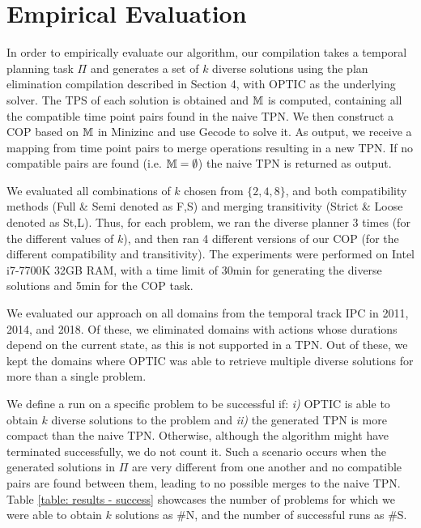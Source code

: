 \section{Empirical Evaluation}
In order to empirically evaluate our algorithm, our compilation takes a temporal planning task $\Pi$ and generates a set of $k$ diverse solutions using the plan elimination compilation described in Section 4, with OPTIC \cite{benton2012temporal} as the underlying solver. The TPS of each solution is obtained and $\mathbb{M}$ is computed, containing all the compatible time point pairs found in the naive TPN.
We then construct a COP based on $\mathbb{M}$ in Minizinc \cite{nethercote2007minizinc} and use Gecode \cite{gecode} to solve it. As output, we receive a mapping from time point pairs to merge operations resulting in a new TPN.
If no compatible pairs are found (i.e. $\mathbb{M} = \emptyset$) the naive TPN is returned as output. 


We evaluated all combinations of $k$ chosen from $\{2,4,8\}$, and both compatibility methods 
(Full \& Semi denoted as F,S) and merging transitivity (Strict \& Loose denoted as St,L). Thus, for each problem, we ran the diverse planner 3 times (for the different values of $k$), and then ran 4 different versions of our COP (for the different compatibility and transitivity). The experiments were performed on Intel i7-7700K 32GB RAM, with a time limit of 30min for generating the diverse solutions and 5min for the COP task.


We evaluated our approach on all domains from the temporal track IPC in 2011, 2014, and 2018. Of these, we eliminated domains with actions whose durations depend on the current state, as this is not supported in a TPN.
Out of these, we kept the domains where OPTIC was able to retrieve multiple diverse solutions for more than a single problem.

We define a run on a specific problem to be successful if: \textit{i)} OPTIC is able to obtain $k$
diverse solutions to the problem and \textit{ii)} the generated TPN is more compact than the naive TPN.
Otherwise, although the algorithm might have terminated successfully, we do not count it.
Such a scenario occurs when the generated solutions in $\Pi$ are very different from one another 
and no compatible pairs are found between them, leading to no possible merges to the naive TPN.
Table \ref{table: results - success} showcases the number of problems for which we were
able to obtain $k$ solutions as \#N, and the number of successful runs as \#S.

